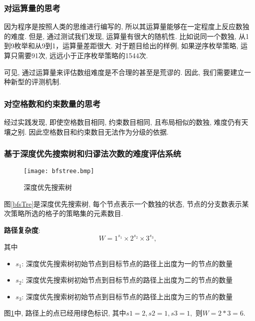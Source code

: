         \subsubsection{对运算量的思考}
            因为程序是按照人类的思维进行编写的, 所以其运算量能够在一定程度上反应数独的难度.
            但是, 通过测试我们发现, 运算量有很大的随机性.
            比如说同一个数独, 从1到9枚举和从9到1，运算量差距很大.
            对于题目给出的样例, 如果逆序枚举策略,
            运算只需要91次, 远远小于正序枚举策略的1544次.

            可见, 通过运算量来评估数组难度是不合理的甚至是荒谬的.
            因此, 我们需要建立一种新型的评测机制.

        \subsubsection{对空格数和约束数量的思考}
            经过实践发现, 即使空格数目相同, 约束数目相同, 且布局相似的数独,
            难度仍有天壤之别. 因此空格数目和约束数目无法作为分级的依据.

        \subsubsection{基于深度优先搜索树和归谬法次数的难度评估系统}
                \begin{figure}[htb]
                    \centering
                    \texttt{[image: bfstree.bmp]}
                    \caption[bfs搜索树]{深度优先搜索树}\label{bfsTre}
                \end{figure}
                图\vref*{bfsTre}是深度优先搜索树, 每个节点表示一个数独的状态,
                节点的分支数表示某次策略所选的格子的策略集的元素数目.
                \begin{dfn}\label{dfnCpl}
                    \textbf{路径复杂度}:
                    \[W=1^{s_{1}}\times2^{s_{2}}\times3^{s_{3}},\]
                    其中
                    \begin{itemize}
                        \item $s_{1}$: 深度优先搜索树初始节点到目标节点的路径上出度为一的节点的数量
                        \item $s_{2}$: 深度优先搜索树初始节点到目标节点的路径上出度为二的节点的数量
                        \item $s_{3}$: 深度优先搜索树初始节点到目标节点的路径上出度为三的节点的数量
                    \end{itemize}
                \end{dfn}
                图\ref{bfsTre}中, 路径上的点已经用绿色标识,
                其中$s1=2, s2=1, s3=1,$ 则$W=2*3=6.$

